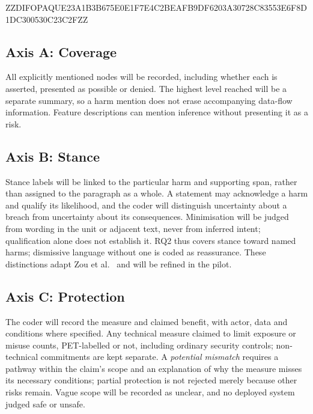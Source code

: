 \documentclass[twoside,its]{bossthesis}
\begin{document}
ZZDIFOPAQUE23A1B3B675E0E1F7E4C2BEAFB9DF6203A30728C83553E6F8D1DC300530C23C2FZZ



\subsection{Axis A: Coverage} All explicitly mentioned nodes will be
recorded, including whether each is asserted, presented as possible or denied.
The highest level reached will be a separate summary, so a harm
mention does not erase accompanying data-flow information. Feature descriptions can mention inference without presenting it as a risk.

\subsection{Axis B: Stance} Stance labels will be linked to the
particular harm and supporting span, rather than assigned to the paragraph
as a whole. A statement may acknowledge a harm and qualify its likelihood,
and the coder will distinguish uncertainty about a breach from uncertainty
about its consequences. Minimisation will be judged from wording in the unit
or adjacent text, never from inferred intent; qualification alone does not
establish it. RQ2 thus covers stance toward named harms; dismissive language
without one is coded as reassurance. These distinctions adapt Zou et
al.~\parencite{zou2019might} and will be refined in the pilot.

\subsection{Axis C: Protection} The coder will record the measure
and claimed benefit, with actor, data and conditions where specified. Any
technical measure claimed to limit exposure or misuse counts, PET-labelled or
not, including ordinary security controls; non-technical commitments are kept
separate. A \emph{potential mismatch} requires a pathway within the claim's
scope and an explanation of why the measure misses its necessary conditions;
partial protection is not rejected merely because other risks remain. Vague
scope will be recorded as unclear, and no deployed system judged safe or
unsafe.
\end{document}
